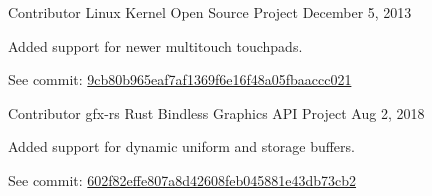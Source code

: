 
\begin{cventries}

  \cventry
  {Contributor}
  {Linux Kernel Open Source Project}
  {}
  {December 5, 2013}
  {
    \begin{cvitems}
      \item{Added support for newer multitouch touchpads.}
      \item{See commit: \href{https://kernel.googlesource.com/pub/scm/linux/kernel/git/clk/linux/+/9cb80b965eaf7af1369f6e16f48a05fbaaccc021}{9cb80b965eaf7af1369f6e16f48a05fbaaccc021}}
    \end{cvitems}
  }

  \cventry
  {Contributor}
  {gfx-rs Rust Bindless Graphics API Project}
  {}
  {Aug 2, 2018}
  {
    \begin{cvitems}
    \item{Added support for dynamic uniform and storage buffers.}
    \item{See commit: \href{https://github.com/gfx-rs/gfx/commit/602f82effe807a8d42608feb045881e43db73cb2}{602f82effe807a8d42608feb045881e43db73cb2}}
    \end{cvitems}
  }
  
\end{cventries}
    